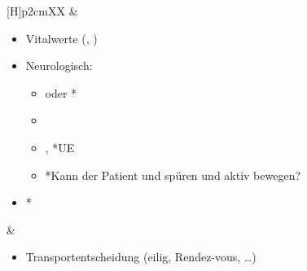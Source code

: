 \documentclass[
ngerman,
paper=a4,
asymmetric,
fontsize=10pt,
headings=small,
draft=false,
numbers=noenddot,
bibtotocnumbered,
footnotes=multiple,
]{scrreprt}
\begin{document}
{\begin{minipage}[t]{\linewidth -
{2\fboxrule} - {2\fboxsep}}
\begin{minipage}[t]{\linewidth}
{\begin{tabularx}{\linewidth}[H]{p{2cm}XX}
&
\begin{minipage}[t]{\linewidth}
\begin{itemize}
  \item Vitalwerte (, )
  \item Neurologisch:
  \begin{itemize}
    \item {} oder *
    \item {}
    \item {}, *UE
    \item *Kann der
    Patient  und  spüren und aktiv
    bewegen?
  \end{itemize}
  \item *
\end{itemize}
\end{minipage}
&
\noindent\color{Indigo}\begin{minipage}[t]{\linewidth}
\begin{itemize}
  \item Transportentscheidung (eilig, Rendez-vous, \ldots)
\end{itemize}
\end{minipage}
\\\addlinespace\midrule\addlinespace
\noindent{}



\end{tabularx}}
\end{minipage}
\end{minipage}}
\end{document}
